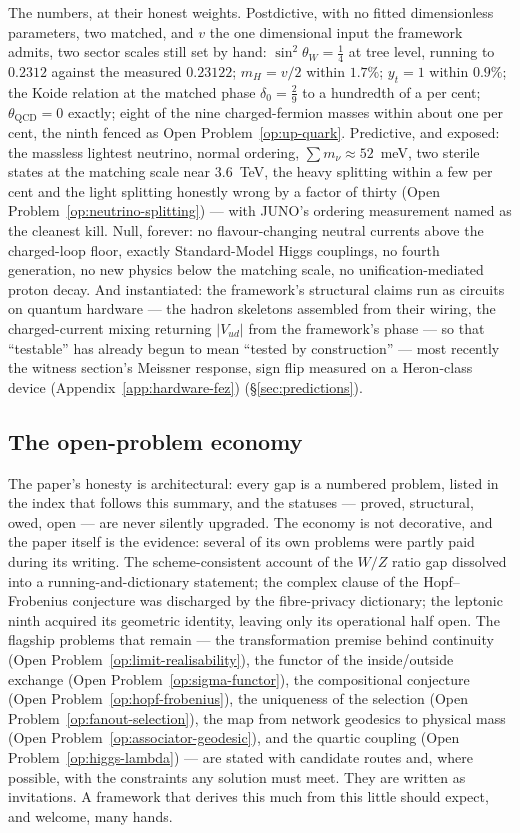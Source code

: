 The numbers, at their honest weights. Postdictive, with no fitted dimensionless parameters, two
matched, and $v$ the one dimensional input the framework admits, two sector scales still set by
hand: $\sin^{2}\theta_{W} = \tfrac14$ at tree level, running to $0.2312$ against the measured
$0.23122$; $m_{H} = v/2$ within $1.7\%$; $y_{t} = 1$ within $0.9\%$; the Koide relation at the
matched phase $\delta_{0} = \tfrac29$ to a hundredth of a per cent; $\theta_{\mathrm{QCD}} = 0$
exactly; eight of the nine charged-fermion masses within about one per cent, the ninth fenced as
Open Problem~\ref{op:up-quark}. Predictive, and exposed: the massless lightest neutrino, normal
ordering, $\sum m_{\nu} \approx 52$~meV, two sterile states at the matching scale near
$3.6$~TeV, the heavy splitting within a few per cent and the light splitting honestly wrong by a
factor of thirty (Open Problem~\ref{op:neutrino-splitting}) --- with JUNO's ordering measurement
named as the cleanest kill. Null, forever: no flavour-changing neutral currents above the
charged-loop floor, exactly Standard-Model Higgs couplings, no fourth generation, no new physics
below the matching scale, no unification-mediated proton decay. And instantiated: the
framework's structural claims run as circuits on quantum hardware --- the hadron skeletons
assembled from their wiring, the charged-current mixing returning $\lvert V_{ud}\rvert$ from the
framework's phase --- so that ``testable'' has already begun to mean ``tested by construction''
--- most recently the witness section's Meissner response, sign flip measured on a Heron-class
device (Appendix~\ref{app:hardware-fez}) (\S\ref{sec:predictions}).

\subsection{The open-problem economy}

The paper's honesty is architectural: every gap is a numbered problem, listed in the index that
follows this summary, and the statuses --- proved, structural, owed, open --- are never silently
upgraded. The economy is not decorative, and the paper itself is the evidence: several of its own
problems were partly paid during its writing. The scheme-consistent account of the $W/Z$ ratio gap
dissolved into a running-and-dictionary statement; the complex clause of the Hopf--Frobenius
conjecture was discharged by the fibre-privacy dictionary; the leptonic ninth acquired its
geometric identity, leaving only its operational half open. The flagship problems that remain ---
the transformation premise behind continuity (Open Problem~\ref{op:limit-realisability}), the functor of the
inside/outside exchange (Open Problem~\ref{op:sigma-functor}), the compositional conjecture
(Open Problem~\ref{op:hopf-frobenius}), the uniqueness of the selection
(Open Problem~\ref{op:fanout-selection}), the map from network geodesics to physical mass
(Open Problem~\ref{op:associator-geodesic}), and the quartic coupling
(Open Problem~\ref{op:higgs-lambda}) --- are stated with candidate routes and, where possible,
with the constraints any solution must meet. They are written as invitations. A framework that
derives this much from this little should expect, and welcome, many hands.

